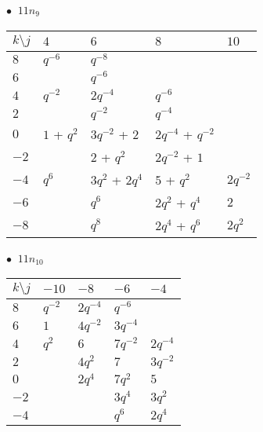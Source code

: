 \begin{minipage}{\linewidth}
$\bullet\ $ $11n_{9}$ \vspace{0.5em} \\
\begin{tabular}{l|llll}
$k \setminus j$ & $4$ & $6$ & $8$ & $10$ \\
\hline
$8$ & $q^{-6}$ & $q^{-8}$ &  &  \\
$6$ &  & $q^{-6}$ &  &  \\
$4$ & $q^{-2}$ & $2q^{-4}$ & $q^{-6}$ &  \\
$2$ &  & $q^{-2}$ & $q^{-4}$ &  \\
$0$ & $1$ + $q^{2}$ & $3q^{-2}$ + $2$ & $2q^{-4}$ + $q^{-2}$ &  \\
$-2$ &  & $2$ + $q^{2}$ & $2q^{-2}$ + $1$ &  \\
$-4$ & $q^{6}$ & $3q^{2}$ + $2q^{4}$ & $5$ + $q^{2}$ & $2q^{-2}$ \\
$-6$ &  & $q^{6}$ & $2q^{2}$ + $q^{4}$ & $2$ \\
$-8$ &  & $q^{8}$ & $2q^{4}$ + $q^{6}$ & $2q^{2}$ \\
\end{tabular}
\vspace{2em}
\end{minipage}
%
\begin{minipage}{\linewidth}
$\bullet\ $ $11n_{10}$ \vspace{0.5em} \\
\begin{tabular}{l|llll}
$k \setminus j$ & $-10$ & $-8$ & $-6$ & $-4$ \\
\hline
$8$ & $q^{-2}$ & $2q^{-4}$ & $q^{-6}$ &  \\
$6$ & $1$ & $4q^{-2}$ & $3q^{-4}$ &  \\
$4$ & $q^{2}$ & $6$ & $7q^{-2}$ & $2q^{-4}$ \\
$2$ &  & $4q^{2}$ & $7$ & $3q^{-2}$ \\
$0$ &  & $2q^{4}$ & $7q^{2}$ & $5$ \\
$-2$ &  &  & $3q^{4}$ & $3q^{2}$ \\
$-4$ &  &  & $q^{6}$ & $2q^{4}$ \\
\end{tabular}
\vspace{2em}
\end{minipage}
%
